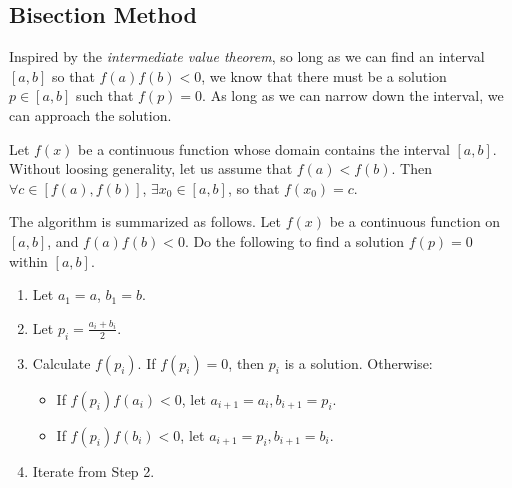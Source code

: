 \subsection{Bisection Method}

Inspired by the \textit{intermediate value theorem}, so long as we can find an interval $\left[a, b\right]$ so that $f(a)f(b)<0$, we know that there must be a solution $p\in\left[a, b\right]$ such that $f(p)=0$. As long as we can narrow down the interval, we can approach the solution.

\begin{shortbox}

Let $f(x)$ be a continuous function whose domain contains the interval $\left[a, b\right]$. Without loosing generality, let us assume that $f(a)<f(b)$. Then $\forall c \in \left[f(a), f(b)\right]$, $\exists x_0 \in \left[a, b\right]$, so that $f(x_0)=c$.

\end{shortbox}

The algorithm is summarized as follows. Let $f(x)$ be a continuous function on $\left[a, b\right]$, and $f(a)f(b)<0$. Do the following to find a solution $f(p)=0$ within $\left[a, b\right]$.

\begin{enumerate}
\item Let $a_1 = a$, $b_1=b$.
\item Let $p_i = \frac{a_i+b_i}{2}$.
\item Calculate $f(p_i)$. If $f(p_i)=0$, then $p_i$ is a solution. Otherwise:
\begin{itemize}
  \item If $f(p_i)f(a_i) < 0$, let $a_{i+1}=a_i, b_{i+1}=p_i$.
  \item If $f(p_i)f(b_i) < 0$, let $a_{i+1}=p_i, b_{i+1}=b_i$.
\end{itemize}
\item Iterate from Step 2.
\end{enumerate}